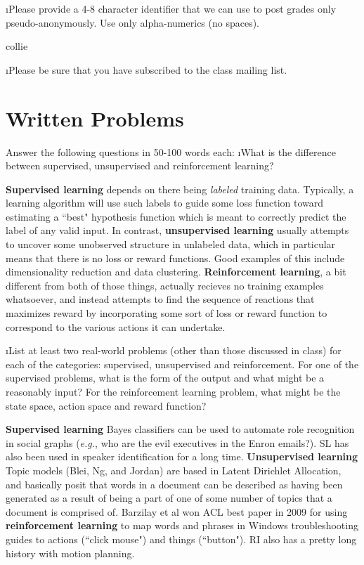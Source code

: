 \documentclass[fleqn]{article}
\begin{document}
\i Please provide a 4-8 character identifier that we can use to post
grades only pseudo-anonymously.  Use only alpha-numerics (no spaces).

 \begin{solution}
   collie
 \end{solution}

\i Please be sure that you have subscribed to the class mailing list.

\ene

\section{Written Problems}

Answer the following questions in 50-100 words each:
\bee
\i What is the difference between supervised, unsupervised and reinforcement learning?

 \begin{solution}
   \textbf{Supervised learning} depends on there being \textit{labeled} training data. Typically, a learning algorithm will use such labels to guide some loss function toward estimating a ``best" hypothesis function which is meant to correctly predict the label of any valid input. In contrast, \textbf{unsupervised learning} usually attempts to uncover some unobserved structure in unlabeled data, which in particular means that there is no loss or reward functions. Good examples of this include dimensionality reduction and data clustering. \textbf{Reinforcement learning}, a bit different from both of those things, actually recieves no training examples whatsoever, and instead attempts to find the sequence of reactions that maximizes reward by incorporating some sort of loss or reward function to correspond to the various actions it can undertake.
 \end{solution}
 
\i List at least two real-world problems (other than those discussed in class) for each of the categories:
  supervised, unsupervised and reinforcement. For one of the supervised problems, what is the form
  of the output and what might be a reasonably input? For the reinforcement learning problem, what
  might be the state space, action space and reward function?
 \begin{solution}
   \textbf{Supervised learning} Bayes classifiers can be used to automate role recognition in social graphs (\textit{e.g.}, who are the evil executives in the Enron emails?). SL has also been used in speaker identification for a long time. \textbf{Unsupervised learning} Topic models (Blei, Ng, and Jordan) are based in Latent Dirichlet Allocation, and basically posit that words in a document can be described as having been generated as a result of being a part of one of some number of topics that a document is comprised of. Barzilay et al won ACL best paper in 2009 for using \textbf{reinforcement learning} to map words and phrases in Windows troubleshooting guides to actions (``click mouse") and things (``button"). RI also has a pretty long history with motion planning.
 \end{solution}
\end{document}

